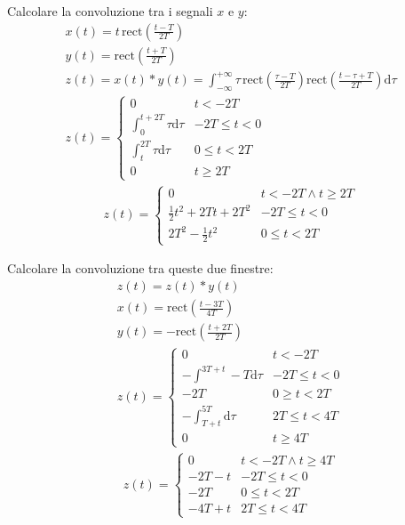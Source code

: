 \documentclass{article}
\newcommand{\rect}{\mathrm{rect}}
\newcommand{\df}{\mathrm{d}}
\begin{document}
Calcolare la convoluzione tra i segnali $x$ e $y$:
\begin{gather*}
    x(t)=\displaystyle t\,\rect\left(\frac{t-T}{2T}\right)\\
    y(t)=\displaystyle\rect\left(\frac{t+T}{2T}\right)\\
    z(t)=x(t)*y(t)=\displaystyle\int_{-\infty}^{+\infty}\tau\,\rect\left(\frac{\tau-T}{2T}\right)\rect\left(\frac{t-\tau+T}{2T}\right)\df\tau\\
    z(t)=\begin{cases}
        0&t<-2T\\
        \displaystyle\int_{0}^{t+2T}\tau \df\tau&-2T\leq t<0\\
        \displaystyle\int_{t}^{2T}\tau \df\tau&0\leq t<2T\\
        0&t\geq2T
    \end{cases}
\end{gather*}
\begin{gather}
    z(t)=\begin{cases}
        0&t<-2T\land t\geq2T\\
        \displaystyle\frac{1}{2}t^2+2Tt+2T^2&-2T\leq t<0\\
        \displaystyle2T^2-\frac{1}{2}t^2&0\leq t<2T
    \end{cases}
\end{gather}


Calcolare la convoluzione tra queste due finestre:
\begin{gather*}
    z(t)=z(t)*y(t)\\
    x(t)=\displaystyle\rect\left(\frac{t-3T}{4T}\right)\\
    y(t)=-\displaystyle\rect\left(\frac{t+2T}{2T}\right)\\
    z(t)=\begin{cases}
        0&t<-2T\\
        -\displaystyle\int^{3T+t}-{T}\df\tau&-2T\leq t<0\\
        -2T&0\geq t<2T\\
        -\displaystyle\int_{T+t}^{5T}\df\tau&2T\leq t<4T\\
        0&t\geq 4T
    \end{cases}
\end{gather*}
\begin{gather}
    z(t)=\begin{cases}
        0&t<-2T \land t\geq 4T\\
        -2T-t&-2T\leq t<0\\
        -2T&0\leq t<2T\\
        -4T+t&2T\leq t<4T
    \end{cases}
\end{gather}
\end{document}
